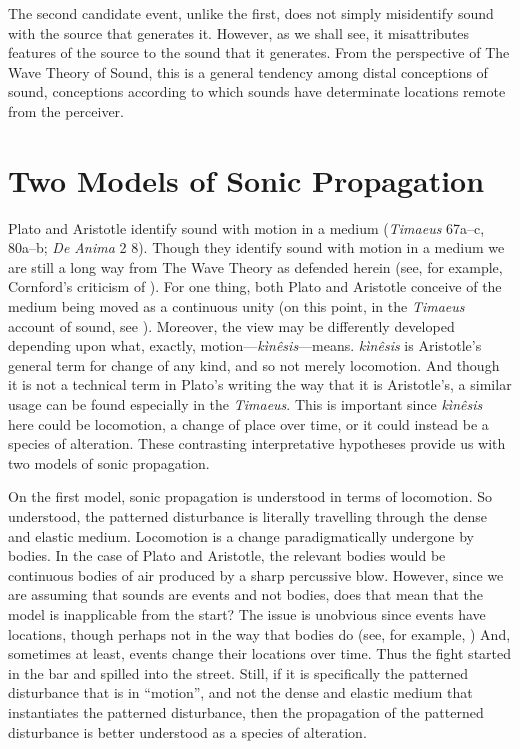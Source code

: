 \documentclass[12pt]{article}
\begin{document}
The second candidate event, unlike the first, does not simply misidentify sound with the source that generates it. However, as we shall see, it misattributes features of the source to the sound that it generates. From the perspective of The Wave Theory of Sound, this is a general tendency among distal conceptions of sound, conceptions according to which sounds have determinate locations remote from the perceiver. 


\section{Two Models of Sonic Propagation} %
\label{sec:two_models_of_sonic_propagation}

Plato and Aristotle identify sound with motion in a medium (\emph{Timaeus} 67a–c, 80a–b; \emph{De Anima} 2 8). Though they identify sound with motion in a medium we are still a long way from The Wave Theory as defended herein (see, for example, Cornford's \citeyear[320 n.1]{Cornford:1935fk} criticism of \citealt{Archer-Hind:1888qd}). For one thing, both Plato and Aristotle conceive of the medium being moved as a continuous unity (on this point, in the \emph{Timaeus} account of sound, see \citealt[109]{Beare:1906uq}). Moreover, the view may be differently developed depending upon what, exactly, motion---\emph{kìnêsis}---means. \emph{kìnêsis} is Aristotle's general term for change of any kind, and so not merely locomotion. And though it is not a technical term in Plato's writing the way that it is Aristotle's, a similar usage can be found especially in the \emph{Timaeus}. This is important since \emph{kìnêsis} here could be locomotion, a change of place over time, or it could instead be a species of alteration. These contrasting interpretative hypotheses provide us with two models of sonic propagation.

On the first model, sonic propagation is understood in terms of locomotion. So understood, the patterned disturbance is literally travelling through the dense and elastic medium. Locomotion is a change paradigmatically undergone by bodies. In the case of Plato and Aristotle, the relevant bodies would be continuous bodies of air produced by a sharp percussive blow. However, since we are assuming that sounds are events and not bodies, does that mean that the model is inapplicable from the start? The issue is unobvious since events have locations, though perhaps not in the way that bodies do (see, for example, \citealt{Davidson:1969da}) And, sometimes at least, events change their locations over time. Thus the fight started in the bar and spilled into the street. Still, if it is specifically the patterned disturbance that is in ``motion'', and not the dense and elastic medium that instantiates the patterned disturbance, then the propagation of the patterned disturbance is better understood as a species of alteration.
\end{document}
